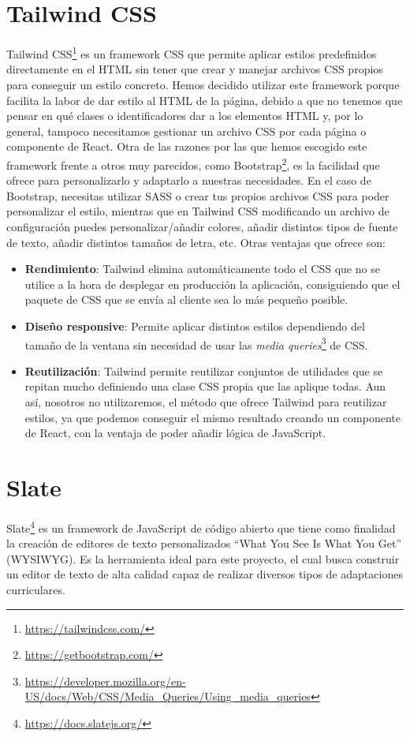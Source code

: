\section{Tailwind CSS}\label{sec:tailwind}
Tailwind CSS\footnote{\url{https://tailwindcss.com/}} es un framework CSS que permite aplicar estilos predefinidos directamente en el HTML sin tener que crear y manejar archivos CSS propios para conseguir un estilo concreto. Hemos decidido utilizar este framework porque facilita la labor de dar estilo al HTML de la página, debido a que no tenemos que pensar en qué clases o identificadores dar a los elementos HTML y, por lo general, tampoco necesitamos gestionar un archivo CSS por cada página o componente de React. Otra de las razones por las que hemos escogido este framework frente a otros muy parecidos, como Bootstrap\footnote{\url{https://getbootstrap.com/}}, es la facilidad que ofrece para personalizarlo y adaptarlo a nuestras necesidades. En el caso de Bootstrap, necesitas utilizar SASS o crear tus propios archivos CSS para poder personalizar el estilo, mientras que en Tailwind CSS modificando un archivo de configuración puedes personalizar/añadir colores, añadir distintos tipos de fuente de texto, añadir distintos tamaños de letra, etc. Otras ventajas que ofrece son:
\begin{itemize}
  \item \textbf{Rendimiento}: Tailwind elimina automáticamente todo el CSS que no se utilice a la hora de desplegar en producción la aplicación, consiguiendo que el paquete de CSS que se envía al cliente sea lo más pequeño posible.
  \item \textbf{Diseño responsive}: Permite aplicar distintos estilos dependiendo del tamaño de la ventana sin necesidad de usar las \textit{media queries}\footnote{\url{https://developer.mozilla.org/en-US/docs/Web/CSS/Media_Queries/Using_media_queries}} de CSS.
  \item \textbf{Reutilización}: Tailwind permite reutilizar conjuntos de utilidades que se repitan mucho definiendo una clase CSS propia que las aplique todas. Aun así, nosotros no utilizaremos, el método que ofrece Tailwind para reutilizar estilos, ya que podemos conseguir el mismo resultado creando un componente de React, con la ventaja de poder añadir lógica de JavaScript.
\end{itemize}

\section{Slate}\label{sec:Slate}
Slate\footnote{\url{https://docs.slatejs.org/}} es un framework de JavaScript de código abierto que tiene como finalidad la creación de editores de texto personalizados ``What You See Is What You Get'' (WYSIWYG). Es la herramienta ideal para este proyecto, el cual busca construir un editor de texto de alta calidad capaz de realizar diversos tipos de adaptaciones curriculares.

